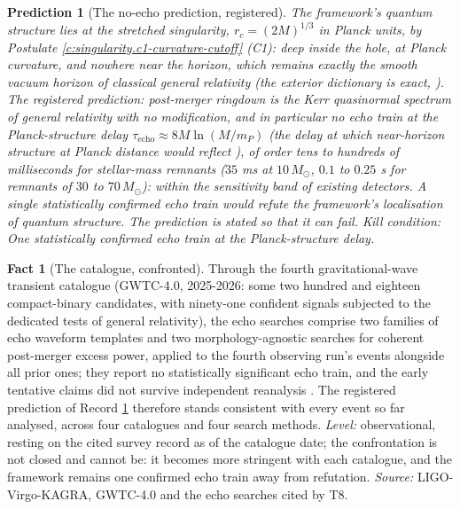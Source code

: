 \documentclass[11pt]{article}
\newtheorem{prediction}[theorem]{Prediction}
\theoremstyle{definition}
\newtheorem{fact}[theorem]{Fact}
\theoremstyle{plain}
\begin{document}
\begin{prediction}[The no-echo prediction, registered]\label{c:scrambling.no-echo-prediction-registered}
The framework's quantum structure lies at the stretched singularity, $r_c = (2M)^{1/3}$ in Planck units, by Postulate \ref{c:singularity.c1-curvature-cutoff} (C1): deep inside the hole, at Planck curvature, and nowhere near the horizon, which remains exactly the smooth vacuum horizon of classical general relativity (the exterior dictionary is exact, \cite[Fact 2.1]{ButlerT6}). The registered prediction: post-merger ringdown is the Kerr quasinormal spectrum of general relativity with \emph{no} modification, and in particular no echo train at the Planck-structure delay $\tau_{\mathrm{echo}} \approx 8M\ln(M/m_P)$ (the delay at which near-horizon structure at Planck distance would reflect \cite{CardosoPani2017}), of order tens to hundreds of milliseconds for stellar-mass remnants ($35$ ms at $10\,M_\odot$, $0.1$ to $0.25$ s for remnants of $30$ to $70\,M_\odot$): within the sensitivity band of existing detectors. A single statistically confirmed echo train would refute the framework's localisation of quantum structure. The prediction is stated so that it can fail.
\emph{Kill condition:} One statistically confirmed echo train at the Planck-structure delay.
\end{prediction}

\begin{fact}[The catalogue, confronted]\label{c:scrambling.catalogue-confronted}
Through the fourth gravitational-wave transient catalogue (GWTC-4.0, 2025-2026: some two hundred and eighteen compact-binary candidates, with ninety-one confident signals subjected to the dedicated tests of general relativity), the echo searches comprise two families of echo waveform templates and two morphology-agnostic searches for coherent post-merger excess power, applied to the fourth observing run's events alongside all prior ones; they report no statistically significant echo train, and the early tentative claims \cite{Abedi2017} did not survive independent reanalysis \cite{Westerweck2018, GWTC4TGR2026}. The registered prediction of Record \ref{c:scrambling.no-echo-prediction-registered} therefore stands consistent with every event so far analysed, across four catalogues and four search methods. \emph{Level:} observational, resting on the cited survey record as of the catalogue date; the confrontation is not closed and cannot be: it becomes more stringent with each catalogue, and the framework remains one confirmed echo train away from refutation.
\emph{Source:} LIGO-Virgo-KAGRA, GWTC-4.0 and the echo searches cited by T8.
\end{fact}
\end{document}
